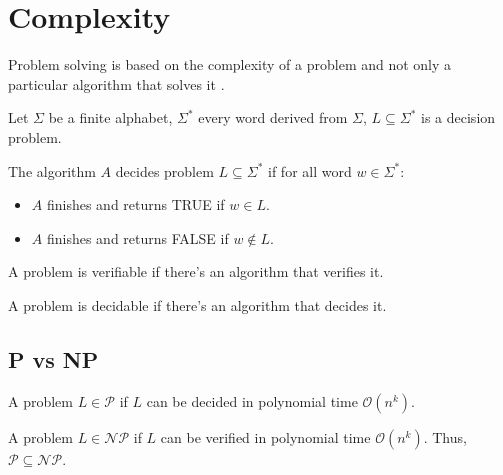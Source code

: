 \section{Complexity}
\label{sec:complex}

Problem solving is based on the complexity of a problem and not only a particular algorithm that solves it \cite{sipser2006}.

\begin{defn}
Let $\Sigma$ be a finite alphabet, $\Sigma^*$ every word derived from $\Sigma$, $L \subseteq \Sigma^*$ is a decision problem.
\end{defn}

\begin{defn}
The algorithm $A$ decides problem $L \subseteq \Sigma^*$ if for all word $w \in \Sigma^*$:
\begin{itemize}
  \item $A$ finishes and returns TRUE if $w \in L$.
  \item $A$ finishes and returns FALSE if $w \notin L$.
\end{itemize}
\end{defn}

\begin{defn}
A problem is verifiable if there's an algorithm that verifies it.
\end{defn}

\begin{defn}
A problem is decidable if there's an algorithm that decides it.
\end{defn}

\subsection{P vs NP}

\begin{defn}
A problem $L \in \mathcal{P}$ if $L$ can be decided in polynomial time $\mathcal{O}(n^k)$.
\end{defn}

\begin{defn}
A problem $L \in \mathcal{NP}$ if $L$ can be verified in polynomial time $\mathcal{O}(n^k)$. Thus, $\mathcal{P} \subseteq \mathcal{NP}$.
\end{defn}

